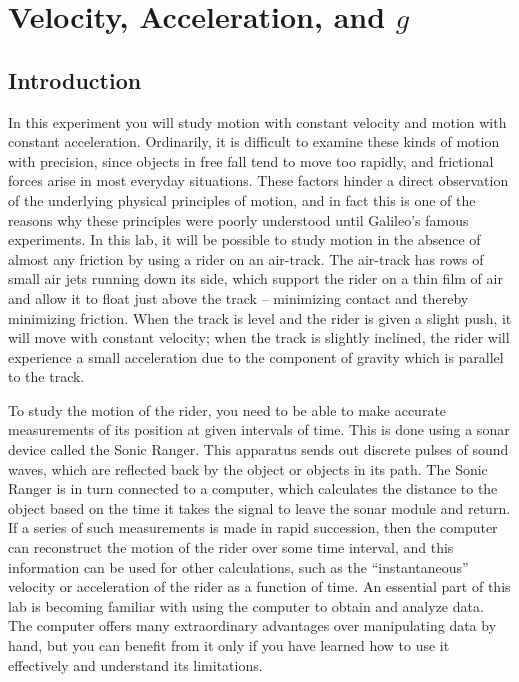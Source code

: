 \chapter{Velocity, Acceleration, and $g$}
\label{chap:velocity}
\section{Introduction}

In this experiment you will study motion with constant velocity and motion with constant acceleration.  Ordinarily, it is difficult to examine these kinds of motion with precision, since objects in free fall tend to move too rapidly, and frictional forces arise in most everyday situations.  These factors hinder a direct observation of the underlying physical principles of motion, and in fact this is one of the reasons why these principles were poorly understood until Galileo's famous experiments.  In this lab, it will be possible to study motion in the absence of almost any friction by using a rider on an air-track.  The air-track has rows of small air jets running down its side, which support the rider on a thin film of air and allow it to float just above the track -- minimizing contact and thereby minimizing friction.  When the track is level and the rider is given a slight push, it will move with constant velocity; when the track is slightly inclined, the rider will experience a small acceleration due to the component of gravity which is parallel to the track. \myskip

To study the motion of the rider, you need to be able to make accurate measurements of its position at given intervals of time.  This is done using a sonar device called the Sonic Ranger.  This apparatus sends out discrete pulses of sound waves, which are reflected back by the object or objects in its path.  The Sonic Ranger is in turn connected to a computer, which calculates the distance to the object based on the time it takes the signal to leave the sonar module and return.  If a series of such measurements is made in rapid succession, then the computer can reconstruct the motion of the rider over some time interval, and this information can be used for other calculations, such as the ``instantaneous'' velocity or acceleration of the rider as a function of time.  An essential part of this lab is becoming familiar with using the computer to obtain and analyze data.  The computer offers many extraordinary advantages over manipulating data by hand, but you can benefit from it only if you have learned how to use it effectively and understand its limitations.

